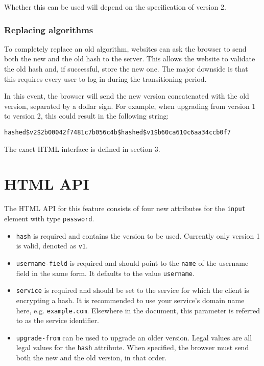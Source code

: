 \documentclass{paper}
\newcommand{\code}[1]{\texttt{\colorbox{gray!11}{#1}}}
\begin{document}
Whether this can be used will depend on the specification of version 2.

\subsubsection{Replacing algorithms}

To completely replace an old algorithm, websites can ask the browser to send both the new and
the old hash to the server. This allows the website to validate the old hash and, if
successful, store the new one. The major downside is that this requires every user to log in
during the transitioning period.

In this event, the browser will send the new version concatenated with the old version,
separated by a dollar sign. For example, when upgrading from version 1 to version 2, this
could result in the following string:

\code{hashed\$v2\$2b00042f7481c7b056c4b\$hashed\$v1\$b60ca610c6aa34ccb0f7}

The exact HTML interface is defined in section 3.

\section{HTML API}

The HTML API for this feature consists of four new attributes for the \code{input} element
with type \code{password}.

\begin{itemize}
\item \code{hash} is required and contains the version to be used. Currently only version 1
is valid, denoted as \code{v1}.
\item \code{username-field} is required and should point to the \code{name} of the username
field in the same form. It defaults to the value \code{username}.
\item \code{service} is required and should be set to the service for which the client is
encrypting a hash. It is recommended to use your service's domain name here, e.g.
\code{example.com}. Elsewhere in the document, this parameter is referred to as the service
identifier.
\item \code{upgrade-from} can be used to upgrade an older version. Legal values are all legal
values for the \code{hash} attribute. When specified, the browser must send both the new and
the old version, in that order.
\end{itemize}
\end{document}
